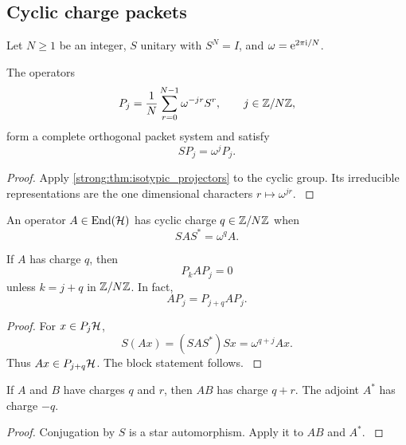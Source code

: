 \subsection{Cyclic charge packets}\label{strong:subsec:cyclic_charge}

Let \(N\ge1\) be an integer, \(S\) unitary with \(S^N=I\), and \(\omega=\mathrm e^{2\pi\mathrm i/N}\).

\begin{corollary}\label{strong:corollary:002}\label{strong:cor:cyclic_projectors}
The operators
\[
P_j
=
\frac1N
\sum_{r=0}^{N-1}
\omega^{-jr}S^r,
\qquad
j\in\mathbb Z/N\mathbb Z,
\]
form a complete orthogonal packet system and satisfy
\[
SP_j=\omega^jP_j.
\]
\end{corollary}

\begin{proof}\label{strong:proof:007}
Apply \cref{strong:thm:isotypic_projectors} to the cyclic group. Its irreducible representations are the one dimensional characters \(r\mapsto\omega^{jr}\).
\label{strong:proof:007:end}\end{proof}

\begin{definition}\label{strong:definition:002}\label{strong:def:operator_charge}
An operator \(A\in\operatorname{End}(\mathcal H)\) has cyclic charge \(q\in\mathbb Z/N\mathbb Z\) when
\[
SAS^*=\omega^qA.
\]
\end{definition}

\begin{theorem}\label{strong:theorem:005}\label{strong:thm:charge_selection}
If \(A\) has charge \(q\), then
\[
P_kAP_j=0
\]
unless \(k=j+q\) in \(\mathbb Z/N\mathbb Z\). In fact,
\[
AP_j=P_{j+q}AP_j.
\]
\end{theorem}

\begin{proof}\label{strong:proof:008}
For \(x\in P_j\mathcal H\),
\[
S(Ax)
=(SAS^*)Sx
=\omega^{q+j}Ax.
\]
Thus \(Ax\in P_{j+q}\mathcal H\). The block statement follows.
\label{strong:proof:008:end}\end{proof}

\begin{corollary}\label{strong:corollary:003}\label{strong:cor:charge_addition}
If \(A\) and \(B\) have charges \(q\) and \(r\), then \(AB\) has charge \(q+r\). The adjoint \(A^*\) has charge \(-q\).
\end{corollary}

\begin{proof}\label{strong:proof:009}
Conjugation by \(S\) is a star automorphism. Apply it to \(AB\) and \(A^*\).
\label{strong:proof:009:end}\end{proof}

